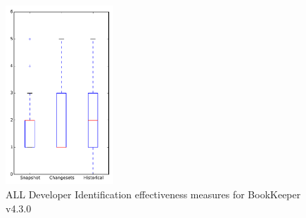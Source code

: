 
\begin{figure}[t]
\centering
\includegraphics[width=0.36\textwidth]{figures/dit/all_bookkeeper}
\caption{ALL Developer Identification effectiveness measures for BookKeeper v4.3.0}
\label{fig:dit:all:bookkeeper}
\end{figure}
